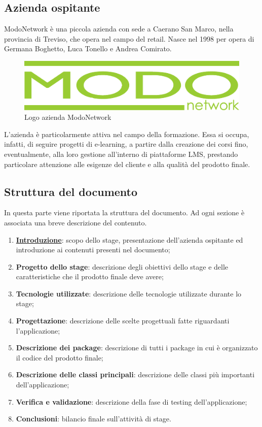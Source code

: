 \documentclass[../Tesi.tex]{subfiles}
\begin{document}
	\subsection{Azienda ospitante}
	ModoNetwork è una piccola azienda con sede a Caerano San Marco, nella provincia di Treviso, che opera nel campo del retail. Nasce nel 1998 per opera di Germana Boghetto, Luca Tonello e Andrea Comirato.
	\begin{figure}[H]
		\centering
		\includegraphics[scale=0.1]{images/logoMN}
		\caption{Logo azienda ModoNetwork}
	\end{figure}
	L'azienda è particolarmente attiva nel campo della formazione. Essa si occupa, infatti, di seguire progetti di e-learning, a partire dalla creazione dei corsi fino, eventualmente, alla loro gestione all'interno di piattaforme LMS, prestando particolare attenzione alle esigenze del cliente e alla qualità del prodotto finale.

	\subsection{Struttura del documento}
		In questa parte viene riportata la struttura del documento. Ad ogni sezione è associata una breve descrizione del contenuto.
		\begin{enumerate}
			\item \hyperlink{label}{\textbf{Introduzione}}: scopo dello stage, presentazione dell'azienda ospitante ed introduzione ai contenuti presenti nel documento;
			\item \textbf{Progetto dello stage}: descrizione degli obiettivi dello stage e delle caratteristiche che il prodotto finale deve avere;
			\item \textbf{Tecnologie utilizzate}: descrizione delle tecnologie utilizzate durante lo stage;
			\item \textbf{Progettazione}: descrizione delle scelte progettuali fatte riguardanti l'applicazione;
			\item \textbf{Descrizione dei package}: descrizione di tutti i package in cui è organizzato il codice del prodotto finale;
			\item \textbf{Descrizione delle classi principali}: descrizione delle classi più importanti dell'applicazione;
			\item \textbf{Verifica e validazione}: descrizione della fase di testing dell'applicazione;
			\item \textbf{Conclusioni}: bilancio finale sull'attività di stage.
		\end{enumerate}
\end{document}
